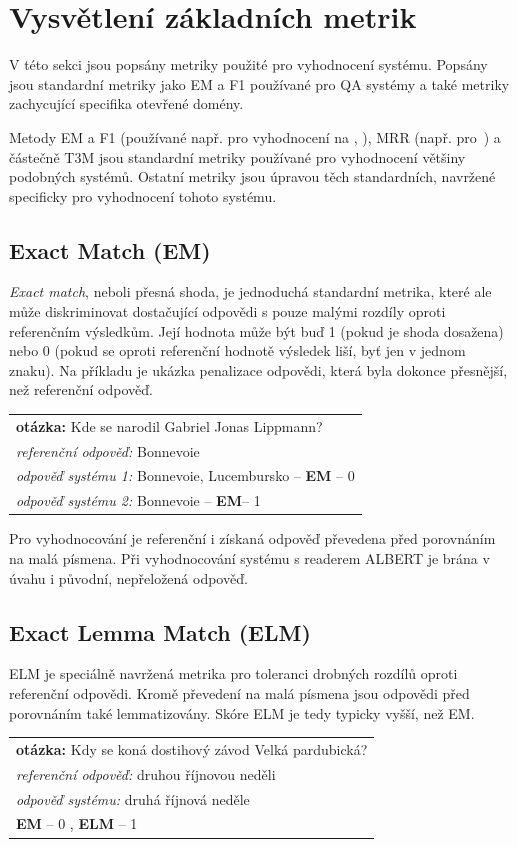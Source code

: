 \section{Vysvětlení základních metrik}
\label{metriky}
V této sekci jsou popsány metriky použité pro vyhodnocení systému. Popsány jsou standardní metriky jako EM a F1 používané pro QA systémy a také metriky zachycující specifika otevřené domény.\par
Metody EM a F1 (používané např. pro vyhodnocení na \cite{squad}, \cite{squad_v2}), MRR (např. pro~\cite{sqad}) a částečně T3M jsou standardní metriky používané pro vyhodnocení většiny podobných systémů. Ostatní metriky jsou úpravou těch standardních, navržené specificky pro vyhodnocení tohoto systému.

\subsection{Exact Match (EM)}
\label{EM}
\emph{Exact match}, neboli přesná shoda, je jednoduchá standardní metrika, které ale může diskriminovat dostačující odpovědi s pouze malými rozdíly oproti referenčním výsledkům. Její hodnota může být buď 1 (pokud je shoda dosažena) nebo 0 (pokud se oproti referenční hodnotě výsledek liší, byť jen v jednom znaku). Na příkladu je ukázka penalizace odpovědi, která byla dokonce přesnější, než referenční odpověď.\par
\begin{center}
\begin{tabular}{l}
    \textbf{otázka:} Kde se narodil Gabriel Jonas Lippmann?\\
    \emph{referenční odpověď:} Bonnevoie\\
    \emph{odpověď systému 1:} Bonnevoie, Lucembursko -- \textbf{EM} -- 0\\
    \emph{odpověď systému 2:} Bonnevoie -- \textbf{EM}-- 1
\end{tabular}
\end{center}
Pro vyhodnocování je referenční i získaná odpověď převedena před porovnáním na malá písmena. Při vyhodnocování systému s readerem ALBERT je brána v úvahu i původní, nepřeložená odpověď.

\subsection{Exact Lemma Match (ELM)}
\label{ELM}
ELM je speciálně navržená metrika pro toleranci drobných rozdílů oproti referenční odpovědi. Kromě převedení na malá písmena jsou odpovědi před porovnáním také lemmatizovány. Skóre ELM je tedy typicky vyšší, než EM.
\begin{center}
\begin{tabular}{l}
    \textbf{otázka:} Kdy se koná dostihový závod Velká pardubická?\\
    \emph{referenční odpověď:} druhou říjnovou neděli\\
    \emph{odpověď systému:} druhá říjnová neděle \\
    \textbf{EM} -- 0 , \textbf{ELM} -- 1\\
\end{tabular}
\end{center}

